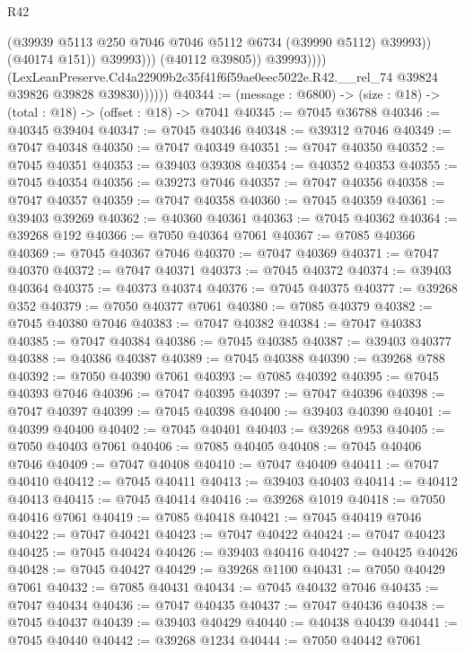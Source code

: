 \begin{lexlean}{R42}
\begin{coremodule}
{                                  (@39939 @5113 @250 @7046 @7046 @5112 @6734 (@39990 @5112) @39993))
                                (@40174 @151))
                              @39993)))
                        (@40112 @39805))
                      @39993))))
              (LexLeanPreserve.Cd4a22909b2c35f41f6f59ae0eec5022e.R42.__rel_74
                @39824
                @39826
                @39828
                @39830))))))
@40344 := (message : @6800) -> (size : @18) -> (total : @18) -> (offset : @18) -> @7041
@40345 := @7045 @36788
@40346 := @40345 @39404
@40347 := @7045 @40346
@40348 := @39312 @7046
@40349 := @7047 @40348
@40350 := @7047 @40349
@40351 := @7047 @40350
@40352 := @7045 @40351
@40353 := @39403 @39308
@40354 := @40352 @40353
@40355 := @7045 @40354
@40356 := @39273 @7046
@40357 := @7047 @40356
@40358 := @7047 @40357
@40359 := @7047 @40358
@40360 := @7045 @40359
@40361 := @39403 @39269
@40362 := @40360 @40361
@40363 := @7045 @40362
@40364 := @39268 @192
@40366 := @7050 @40364 @7061
@40367 := @7085 @40366
@40369 := @7045 @40367 @7046
@40370 := @7047 @40369
@40371 := @7047 @40370
@40372 := @7047 @40371
@40373 := @7045 @40372
@40374 := @39403 @40364
@40375 := @40373 @40374
@40376 := @7045 @40375
@40377 := @39268 @352
@40379 := @7050 @40377 @7061
@40380 := @7085 @40379
@40382 := @7045 @40380 @7046
@40383 := @7047 @40382
@40384 := @7047 @40383
@40385 := @7047 @40384
@40386 := @7045 @40385
@40387 := @39403 @40377
@40388 := @40386 @40387
@40389 := @7045 @40388
@40390 := @39268 @788
@40392 := @7050 @40390 @7061
@40393 := @7085 @40392
@40395 := @7045 @40393 @7046
@40396 := @7047 @40395
@40397 := @7047 @40396
@40398 := @7047 @40397
@40399 := @7045 @40398
@40400 := @39403 @40390
@40401 := @40399 @40400
@40402 := @7045 @40401
@40403 := @39268 @953
@40405 := @7050 @40403 @7061
@40406 := @7085 @40405
@40408 := @7045 @40406 @7046
@40409 := @7047 @40408
@40410 := @7047 @40409
@40411 := @7047 @40410
@40412 := @7045 @40411
@40413 := @39403 @40403
@40414 := @40412 @40413
@40415 := @7045 @40414
@40416 := @39268 @1019
@40418 := @7050 @40416 @7061
@40419 := @7085 @40418
@40421 := @7045 @40419 @7046
@40422 := @7047 @40421
@40423 := @7047 @40422
@40424 := @7047 @40423
@40425 := @7045 @40424
@40426 := @39403 @40416
@40427 := @40425 @40426
@40428 := @7045 @40427
@40429 := @39268 @1100
@40431 := @7050 @40429 @7061
@40432 := @7085 @40431
@40434 := @7045 @40432 @7046
@40435 := @7047 @40434
@40436 := @7047 @40435
@40437 := @7047 @40436
@40438 := @7045 @40437
@40439 := @39403 @40429
@40440 := @40438 @40439
@40441 := @7045 @40440
@40442 := @39268 @1234
@40444 := @7050 @40442 @7061
}
\end{coremodule}
\end{lexlean}
